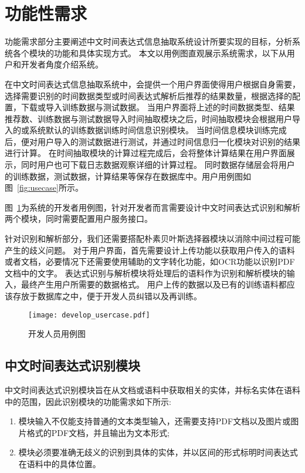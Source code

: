 \section{功能性需求}

功能需求部分主要阐述中文时间表达式信息抽取系统设计所要实现的目标，分析系统各个模块的功能和具体实现方式。
本文以用例图直观展示系统需求，以下从用户和开发者角度介绍系统。

在中文时间表达式信息抽取系统中，会提供一个用户界面使得用户根据自身需要，选择需要识别的时间数据类型或时间表达式解析后推荐的结果数量，根据选择的配置，下载或导入训练数据与测试数据。
当用户界面将上述的时间数据类型、结果推荐数、训练数据与测试数据导入时间抽取模块之后，时间抽取模块会根据用户导入的或系统默认的训练数据训练时间信息识别模块。
当时间信息模块训练完成后，便对用户导入的测试数据进行测试，并通过时间信息归一化模块对识别的结果进行计算。
在时间抽取模块的计算过程完成后，会将整体计算结果在用户界面展示，同时用户也可下载日志数据观察详细的计算过程。
同时数据存储层会将用户的训练数据，测试数据，计算结果等保存在数据库中。用户用例图如图~\ref{fig:usecase}所示。

图~\ref{fig:develope_usecase}为系统的开发者用例图，针对开发者而言需要设计中文时间表达式识别和解析两个模块，同时需要配置用户服务接口。

针对识别和解析部分，我们还需要搭配朴素贝叶斯选择器模块以消除中间过程可能产生的歧义问题。
对于用户界面，首先需要设计上传功能以获取用户传入的语料或者文档，必要情况下还需要使用辅助的文字转化功能，如OCR功能以识别PDF文档中的文字。
表达式识别与解析模块将处理后的语料作为识别和解析模块的输入，最终产生用户所需要的数据格式。
用户上传的数据以及已有的训练语料都应该存放于数据库之中，便于开发人员纠错以及再训练。

\begin{figure}[h]
    \centering
    \texttt{[image: develop\_usercase.pdf]}
    \caption{开发人员用例图}
    \label{fig:develope_usecase}
\end{figure}

\subsection{中文时间表达式识别模块}

中文时间表达式识别模块旨在从文档或语料中获取相关的实体，并标名实体在语料中的范围，因此识别模块的功能需求如下所示:
\begin{enumerate}
    \item[(1)] 模块输入不仅能支持普通的文本类型输入，还需要支持PDF文档以及图片或图片格式的PDF文档，并且输出为文本形式;
    \item[(2)] 模块必须要准确无歧义的识别到具体的实体，并以区间的形式标明时间表达式在语料中的具体位置。
\end{enumerate}

